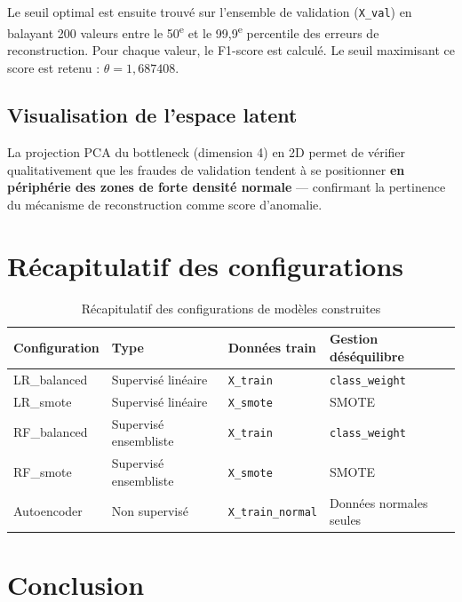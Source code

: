 Le seuil optimal est ensuite trouvé sur l'ensemble de validation (\texttt{X\_val}) en
balayant 200 valeurs entre le 50\textsuperscript{e} et le 99,9\textsuperscript{e}
percentile des erreurs de reconstruction. Pour chaque valeur, le F1-score est calculé.
Le seuil maximisant ce score est retenu : \textbf{$\theta = 1{,}687408$}.

\subsection{Visualisation de l'espace latent}

La projection PCA du bottleneck (dimension 4) en 2D permet de vérifier qualitativement
que les fraudes de validation tendent à se positionner \textbf{en périphérie des zones de
forte densité normale} --- confirmant la pertinence du mécanisme de reconstruction comme
score d'anomalie.

\section{Récapitulatif des configurations}

\begin{table}[H]
\centering
\caption{Récapitulatif des configurations de modèles construites}
\label{tab:models_recap}
\begin{tabular}{p{2.8cm}p{3cm}p{3cm}p{3.5cm}}
\toprule
\textbf{Configuration} & \textbf{Type} & \textbf{Données train}
  & \textbf{Gestion déséquilibre} \\
\midrule
LR\_balanced  & Supervisé linéaire   & \texttt{X\_train}        & \texttt{class\_weight} \\
LR\_smote     & Supervisé linéaire   & \texttt{X\_smote}        & SMOTE \\
RF\_balanced  & Supervisé ensembliste & \texttt{X\_train}       & \texttt{class\_weight} \\
RF\_smote     & Supervisé ensembliste & \texttt{X\_smote}       & SMOTE \\
Autoencoder   & Non supervisé        & \texttt{X\_train\_normal} & Données normales seules \\
\bottomrule
\end{tabular}
\end{table}

\section*{Conclusion}

